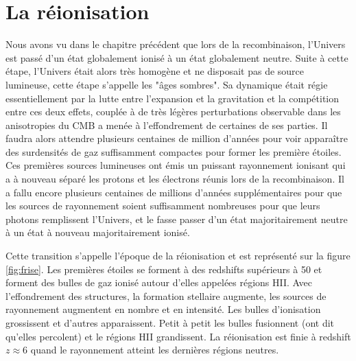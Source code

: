 
\chapter{La réionisation} 
\label{sec:introreio}

%
%
%
%



Nous avons vu dans le chapitre précédent que lors de la recombinaison, l'Univers est passé d'un état globalement ionisé à un état globalement neutre.
Suite à cette étape, l'Univers était alors très homogène et ne disposait pas de source lumineuse, cette étape s'appelle les "âges sombres".
Sa dynamique était régie essentiellement par la lutte entre l'expansion et la gravitation et la compétition entre ces deux effets, couplée à de très légères perturbations observable dans les anisotropies du \ac{CMB} a menée à l'effondrement de certaines de ses parties.
Il faudra alors attendre plusieurs centaines de million d'années pour voir apparaître des surdensités de gaz suffisamment compactes pour former les première étoiles.
Ces premières sources lumineuses ont émis un puissant rayonnement ionisant qui a à nouveau séparé les protons et les électrons réunis lors de la recombinaison.
Il a fallu encore plusieurs centaines de millions d'années supplémentaires pour que les sources de rayonnement soient suffisamment nombreuses pour que leurs photons remplissent l'Univers, et le fasse passer d'un état majoritairement neutre à un état à nouveau majoritairement ionisé.

Cette transition s'appelle l’époque de la réionisation et est représenté sur la figure \ref{fig:frise}.
Les premières étoiles se forment à des redshifts supérieurs à 50 et forment des bulles de gaz ionisé autour d'elles appelées régions HII.
Avec l’effondrement des structures, la formation stellaire augmente, les sources de rayonnement augmentent en nombre et en intensité.
Les bulles d'ionisation grossissent et d'autres apparaissent.
Petit à petit les bulles fusionnent (ont dit qu'elles percolent) et le régions HII grandissent.
La réionisation est finie à redshift $z\approx 6$ quand le rayonnement atteint les dernières régions neutres.

